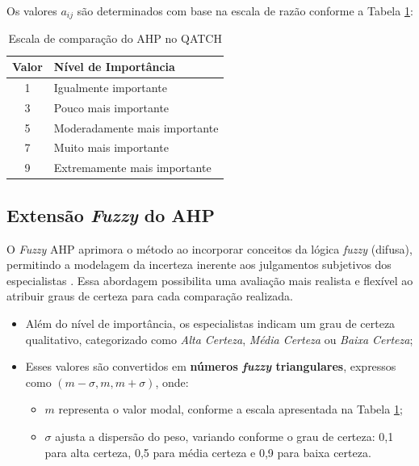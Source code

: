 Os valores \( a_{ij} \) são determinados com base na escala de razão conforme a Tabela \ref{tab:ahp_scale}:

\begin{table}[h]
\centering
\caption{Escala de comparação do AHP no QATCH}
\label{tab:ahp_scale}
\begin{tabular}{|c|l|}
\hline
\textbf{Valor} & \textbf{Nível de Importância} \\ \hline
1 & Igualmente importante \\ \hline
3 & Pouco mais importante \\ \hline
5 & Moderadamente mais importante \\ \hline
7 & Muito mais importante \\ \hline
9 & Extremamente mais importante \\ \hline
\end{tabular}
\end{table}

\subsection{Extensão \textit{Fuzzy} do AHP}

O \textit{Fuzzy} AHP aprimora o método ao incorporar conceitos da lógica \textit{fuzzy} (difusa), permitindo a modelagem da incerteza inerente aos julgamentos subjetivos dos especialistas \cite{qatch}. Essa abordagem possibilita uma avaliação mais realista e flexível ao atribuir graus de certeza para cada comparação realizada.

\begin{itemize}
    \item Além do nível de importância, os especialistas indicam um grau de certeza qualitativo, categorizado como \textit{Alta Certeza}, \textit{Média Certeza} ou \textit{Baixa Certeza};
    \item Esses valores são convertidos em \textbf{números \textit{fuzzy} triangulares}, expressos como \( (m - \sigma, m, m + \sigma) \), onde:
    \begin{itemize}
        \item \( m \) representa o valor modal, conforme a escala apresentada na Tabela \ref{tab:ahp_scale};
        \item \( \sigma \) ajusta a dispersão do peso, variando conforme o grau de certeza: 0,1 para alta certeza, 0,5 para média certeza e 0,9 para baixa certeza.
    \end{itemize}
\end{itemize}

